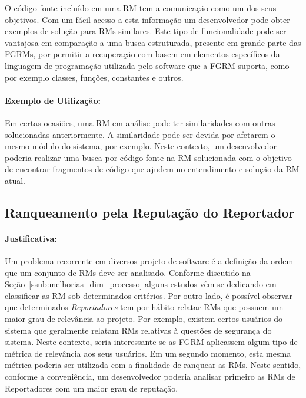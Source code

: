O código fonte incluído em uma RM tem a comunicação como um dos seus objetivos.
Com um fácil acesso a esta informação um desenvolvedor pode obter exemplos de
solução para RMs similares. Este tipo de funcionalidade pode ser vantajosa em
comparação a uma busca estruturada, presente em grande parte das FGRMs, por
permitir a recuperação com basem em elementos específicos da linguagem de
programação utilizada pelo software que a FGRM suporta, como por exemplo
classes, funções, constantes e outros.

\paragraph{Exemplo de Utilização:}
\label{par:exemplo_s02}

Em certas ocasiões, uma RM em análise pode ter similaridades com outras
solucionadas anteriormente. A similaridade pode ser devida por afetarem o mesmo
módulo do sistema, por exemplo. Neste contexto, um desenvolvedor poderia
realizar uma busca por código fonte na RM solucionada com o objetivo de
encontrar fragmentos de código que ajudem no entendimento e solução da RM atual.

\subsection{Ranqueamento pela Reputação do Reportador}
\label{sub:diferenciacao_do_reportdor}


\paragraph{Justificativa:}
\label{par:justificativa_s03}

Um problema recorrente em diversos projeto de software é a definição da ordem
que um conjunto de RMs deve ser analisado. Conforme discutido na
Seção~\ref{ssub:melhorias_dim_processo} alguns estudos vêm se dedicando em
classificar as RM sob determinados critérios. Por outro lado, é possível
observar que determinados \textit{Reportadores} tem por hábito relatar RMs que
possuem um maior grau de relevância ao projeto. Por exemplo, existem certos
usuários do sistema que geralmente relatam RMs relativas à questões de segurança
do sistema. Neste contexto, seria interessante se as FGRM aplicassem algum tipo
de métrica de relevância aos seus usuários. Em um segundo momento, esta mesma
métrica poderia ser utilizada com a finalidade de ranquear as RMs. Neste
sentido, conforme a conveniência, um desenvolvedor poderia analisar primeiro as
RMs de Reportadores com um maior grau de reputação.

